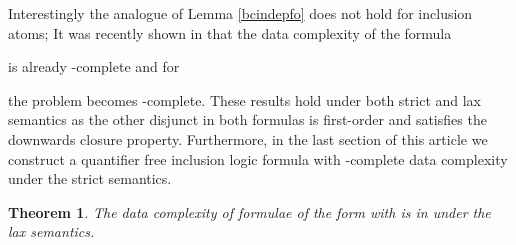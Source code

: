 \documentclass{article}
\theoremstyle{plain}
\newtheorem{theorem}{Theorem}
\theoremstyle{definition}
\begin{document}
Interestingly the analogue of Lemma \ref{bcindepfo} does not hold for inclusion atoms; It was recently shown in \cite{HannulaH19} that the data complexity of the formula

is already -complete and for 

the problem becomes -complete. These results hold under both strict and lax semantics as the other disjunct in both formulas is first-order and satisfies the downwards closure property.
Furthermore, in the last section of this article we construct a quantifier free inclusion logic formula with -complete data complexity under the strict semantics.
\begin{theorem}\label{thm13}
The data complexity of  formulae of the form   with  is in  under the lax semantics.
\end{theorem}
\end{document}
